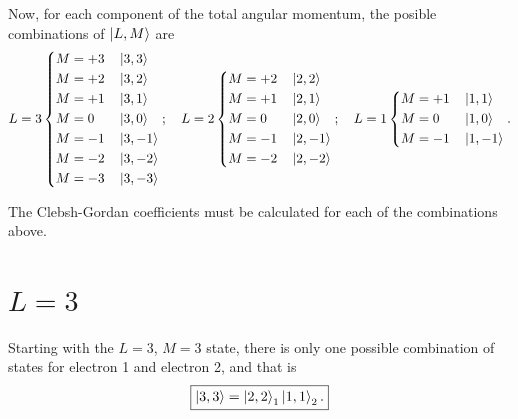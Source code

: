 Now, for each component of the total angular momentum, the posible combinations of $\Ket{L,M}$ are
\begin{equation}
    L = 3
    \begin{dcases}
        M = +3 & \, \Ket{3,3}  \\
        M = +2 & \, \Ket{3,2}  \\
        M = +1 & \, \Ket{3,1}  \\
        M = 0  & \, \Ket{3,0}  \\
        M = -1 & \, \Ket{3,-1} \\
        M = -2 & \, \Ket{3,-2} \\
        M = -3 & \, \Ket{3,-3}
    \end{dcases}
    ; \quad 
    L = 2
    \begin{dcases}
        M = +2 & \, \Ket{2,2}  \\
        M = +1 & \, \Ket{2,1}  \\
        M = 0  & \, \Ket{2,0}  \\
        M = -1 & \, \Ket{2,-1} \\
        M = -2 & \, \Ket{2,-2}
    \end{dcases}
    ; \quad 
    L = 1
    \begin{dcases}
        M = +1 & \, \Ket{1,1}  \\
        M = 0  & \, \Ket{1,0}  \\
        M = -1 & \, \Ket{1,-1}
    \end{dcases}
    .
\end{equation}

The Clebsh-Gordan coefficients must be calculated for each of the combinations above.
%
%

\section{$L = 3$}

Starting with the $L=3$, $M=3$ state, there is only one possible combination of states for electron 1 and electron 2, and that is 
\begin{equation}\label{eq:ket_3_3}
    \boxed{
        \Ket{3,3} = \Ket{2,2}_1 \Ket{1,1}_2.
    }
\end{equation}

